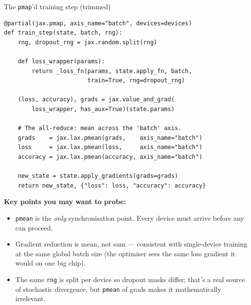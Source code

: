\documentclass[aspectratio=169,10pt]{beamer}
\begin{document}
\begin{frame}[fragile]{The \texttt{pmap}'d training step (trimmed)}
\begin{lstlisting}[style=py]
@partial(jax.pmap, axis_name="batch", devices=devices)
def train_step(state, batch, rng):
    rng, dropout_rng = jax.random.split(rng)

    def loss_wrapper(params):
        return _loss_fn(params, state.apply_fn, batch,
                        train=True, rng=dropout_rng)

    (loss, accuracy), grads = jax.value_and_grad(
        loss_wrapper, has_aux=True)(state.params)

    # The all-reduce: mean across the 'batch' axis.
    grads    = jax.lax.pmean(grads,    axis_name="batch")
    loss     = jax.lax.pmean(loss,     axis_name="batch")
    accuracy = jax.lax.pmean(accuracy, axis_name="batch")

    new_state = state.apply_gradients(grads=grads)
    return new_state, {"loss": loss, "accuracy": accuracy}
\end{lstlisting}
  \vspace{-0.4em}
  \small
  \textbf{Key points you may want to probe:}
  \begin{itemize}
    \item \texttt{pmean} is the \emph{only} synchronisation point. Every device must arrive
          before any can proceed.
    \item Gradient reduction is mean, not sum — consistent with single-device training at
          the same global batch size (the optimiser sees the same loss gradient it would
          on one big chip).
    \item The same \texttt{rng} is split per device so dropout masks differ; that's a
          real source of stochastic divergence, but \texttt{pmean} of grads makes it
          mathematically irrelevant.
  \end{itemize}
\end{frame}
\end{document}
